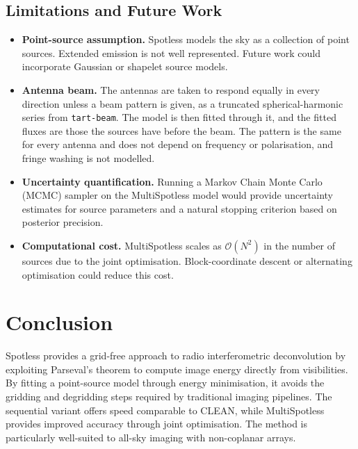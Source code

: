 \documentclass[a4paper,11pt]{article}
\begin{document}
\subsection{Limitations and Future Work}

\begin{itemize}[leftmargin=*,nosep]
	\item \textbf{Point-source assumption.} Spotless models the sky as a
	      collection of point sources. Extended emission is not well
	      represented. Future work could incorporate Gaussian or
	      shapelet source models.
	\item \textbf{Antenna beam.} The antennas are taken to respond
	      equally in every direction unless a beam pattern is given, as a
	      truncated spherical-harmonic series from \texttt{tart-beam}. The
	      model is then fitted through it, and the fitted fluxes are those
	      the sources have before the beam. The pattern is the same for
	      every antenna and does not depend on frequency or polarisation,
	      and fringe washing is not modelled.
	\item \textbf{Uncertainty quantification.} Running a Markov Chain
	      Monte Carlo (MCMC) sampler on the MultiSpotless model would
	      provide uncertainty estimates for source parameters and a
	      natural stopping criterion based on posterior precision.
	\item \textbf{Computational cost.} MultiSpotless scales as
	      $\mathcal{O}(N^2)$ in the number of sources due to the joint
	      optimisation. Block-coordinate descent or alternating
	      optimisation could reduce this cost.
\end{itemize}

\section{Conclusion}

Spotless provides a grid-free approach to radio interferometric
deconvolution by exploiting Parseval's theorem to compute image energy
directly from visibilities. By fitting a point-source model through
energy minimisation, it avoids the gridding and degridding steps
required by traditional imaging pipelines. The sequential variant offers
speed comparable to CLEAN, while MultiSpotless provides improved
accuracy through joint optimisation. The method is particularly
well-suited to all-sky imaging with non-coplanar arrays.



\end{document}
